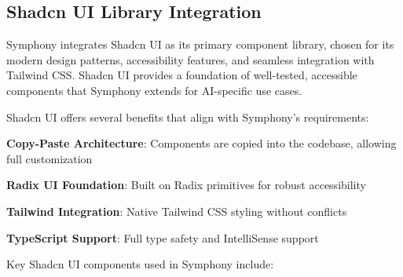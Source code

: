 \subsection*{Shadcn UI Library Integration}

Symphony integrates Shadcn UI as its primary component library, chosen for its modern design patterns, accessibility features, and seamless integration with Tailwind CSS. Shadcn UI provides a foundation of well-tested, accessible components that Symphony extends for AI-specific use cases.

\begin{infobox}[title=Shadcn UI Advantages for Symphony]
Shadcn UI offers several benefits that align with Symphony's requirements:
\begin{compactlist}
    \item \textbf{Copy-Paste Architecture}: Components are copied into the codebase, allowing full customization
    \item \textbf{Radix UI Foundation}: Built on Radix primitives for robust accessibility
    \item \textbf{Tailwind Integration}: Native Tailwind CSS styling without conflicts
    \item \textbf{TypeScript Support}: Full type safety and IntelliSense support
\end{compactlist}
\end{infobox}

Key Shadcn UI components used in Symphony include:

